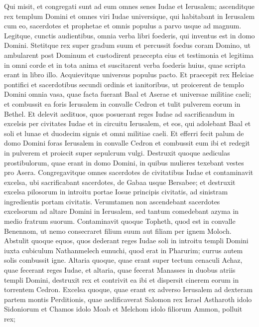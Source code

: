 \begin{biblechapter}  
\verse Qui misit, et congregati sunt ad eum omnes senes Iudae et Ierusalem; 
\verse ascenditque rex templum Domini et omnes viri Iudae universique, qui habitabant in Ierusalem cum eo, sacerdotes et prophetae et omnis populus a parvo usque ad magnum. Legitque, cunctis audientibus, omnia verba libri foederis, qui inventus est in domo Domini. 
\verse Stetitque rex super gradum suum et percussit foedus coram Domino, ut ambularent post Dominum et custodirent praecepta eius et testimonia et legitima in omni corde et in tota anima et suscitarent verba foederis huius, quae scripta erant in libro illo. Acquievitque universus populus pacto. 
\verse Et praecepit rex Helciae pontifici et sacerdotibus secundi ordinis et ianitoribus, ut proicerent de templo Domini omnia vasa, quae facta fuerant Baal et Aserae et universae militiae caeli; et combussit ea foris Ierusalem in convalle Cedron et tulit pulverem eorum in Bethel. 
\verse Et delevit aedituos, quos posuerant reges Iudae ad sacrificandum in excelsis per civitates Iudae et in circuitu Ierusalem, et eos, qui adolebant Baal et soli et lunae et duodecim signis et omni militiae caeli. 
\verse Et efferri fecit palum de domo Domini foras Ierusalem in convalle Cedron et combussit eum ibi et redegit in pulverem et proiecit super sepulcrum vulgi. 
\verse Destruxit quoque aediculas prostibulorum, quae erant in domo Domini, in quibus mulieres texebant vestes pro Asera. 
\verse Congregavitque omnes sacerdotes de civitatibus Iudae et contaminavit excelsa, ubi sacrificabant sacerdotes, de Gabaa usque Bersabee; et destruxit excelsa pilosorum in introitu portae Iosue principis civitatis, ad sinistram ingredientis portam civitatis. 
\verse Verumtamen non ascendebant sacerdotes excelsorum ad altare Domini in Ierusalem, sed tantum comedebant azyma in medio fratrum suorum. 
\verse Contaminavit quoque Topheth, quod est in convalle Benennom, ut nemo consecraret filium suum aut filiam per ignem Moloch. 
\verse Abstulit quoque equos, quos dederant reges Iudae soli in introitu templi Domini iuxta cubiculum Nathanmelech eunuchi, quod erat in Pharurim; currus autem solis combussit igne. 
\verse Altaria quoque, quae erant super tectum cenaculi Achaz, quae fecerant reges Iudae, et altaria, quae fecerat Manasses in duobus atriis templi Domini, destruxit rex et contrivit ea ibi et dispersit cinerem eorum in torrentem Cedron. 
\verse Excelsa quoque, quae erant ex adverso Ierusalem ad dexteram partem montis Perditionis, quae aedificaverat Salomon rex Israel Astharoth idolo Sidoniorum et Chamos idolo Moab et Melchom idolo filiorum Ammon, polluit rex; 

\end{biblechapter}
